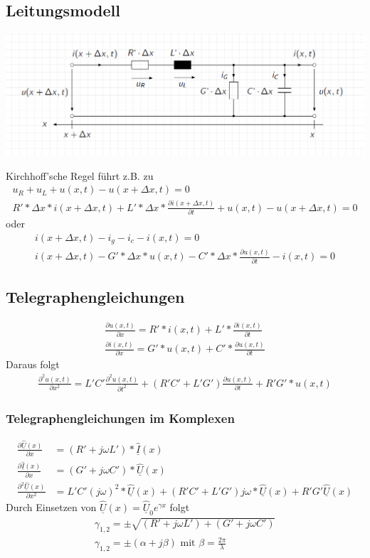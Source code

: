 \documentclass[11pt]{scrartcl}
\def\Uc{\underline{\hat U}}
\def\Ic{\underline{\hat I}}
\begin{document}
\subsection{Leitungsmodell}
\begin{center}
	\includegraphics[width=\textwidth]{Grafiken/01_Leitungsmodell.png}
\end{center}
Kirchhoff'sche Regel führt z.B. zu
\begin{gather*}
	u_R+u_L+u(x,t)-u(x+\Delta x,t)=0 \\	
	R'*\Delta x*i(x+\Delta x,t)+L'*\Delta x*\frac{\partial i(x+\Delta x,t)}{\partial t}+u(x,t)-u(x+\Delta x,t)=0
\end{gather*}
oder
\begin{gather*}
	i(x+\Delta x,t)-i_g-i_c-i(x,t)=0 \\
	i(x+\Delta x,t)-G'*\Delta x*u(x,t)-C'*\Delta x*\frac{\partial u(x,t)}{\partial t}-i(x,t)=0
\end{gather*}
	\subsection{Telegraphengleichungen}
	\begin{eqnarray*}
		\frac{\partial u(x,t)}{\partial x}=R'*i(x,t)+L'*\frac{\partial i(x,t)}{\partial t}\\
		\frac{\partial i(x,t)}{\partial x}=G'*u(x,t)+C'*\frac{\partial u(x,t)}{\partial t}
	\end{eqnarray*}
	Daraus folgt
	\begin{eqnarray*}
		\frac{\partial ^2u(x,t)}{\partial x^2}=L'C'\frac{\partial ^2u(x,t)}{\partial t^2}+(R'C'+L'G')\frac{\partial u(x,t)}{\partial t}+R'G'*u(x,t)
	\end{eqnarray*}
	\subsubsection{Telegraphengleichungen im Komplexen}
	\begin{align}
		\frac{\partial \Uc(x)}{\partial x}&=(R'+j\omega L')*\Ic(x) \\
		\frac{\partial \Ic(x)}{\partial x}&=(G'+j\omega C')*\Uc(x) \\
		\frac{\partial ^2\Uc(x)}{\partial x^2}&=L'C'(j\omega)^2*\Uc(x)+(R'C'+L'G')j\omega*\Uc(x)+R'G'\Uc(x)	
	\end{align}
Durch Einsetzen von $\Uc(x)=\Uc_0e^{\gamma x}$ folgt
\begin{eqnarray*}
	\gamma_{1,2}=\pm \sqrt{(R'+j\omega L')+(G'+j\omega C')} \\
	\gamma_{1,2}=\pm (\alpha+j\beta) \text{ mit } \beta=\frac{2\pi}{\lambda}
\end{eqnarray*} 
\end{document}
